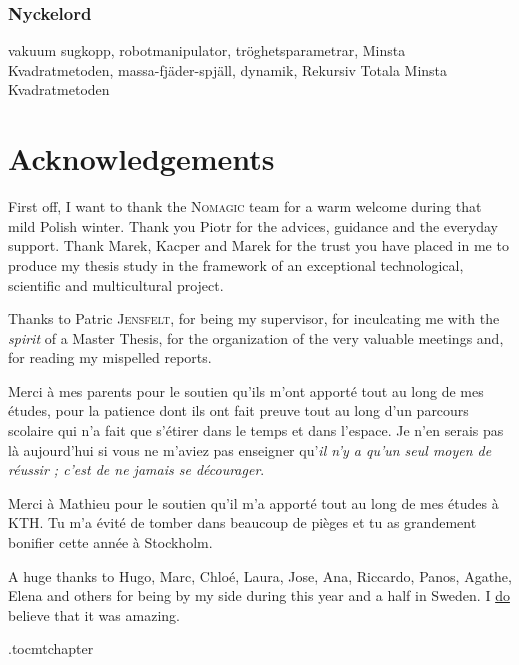 \documentclass[/home/francois/latex/report/main.tex]{subfiles}
\begin{document}
\subsection*{Nyckelord}

vakuum sugkopp, robotmanipulator, tröghetsparametrar, Minsta Kvadratmetoden, massa-fjäder-spjäll, dynamik, Rekursiv Totala Minsta Kvadratmetoden

\newpage
\thispagestyle{plain}
\chapter*{Acknowledgements}

First off, I want to thank the \textsc{Nomagic} team for a warm welcome during that mild Polish winter. Thank you Piotr for the advices, guidance and the everyday support. Thank Marek, Kacper and Marek for the trust you have placed in me to produce my thesis study in the framework of an exceptional technological, scientific and multicultural project.

Thanks to Patric \textsc{Jensfelt}, for being my supervisor, for inculcating me with the \textit{spirit} of a Master Thesis, for the organization of the very valuable meetings and, for reading my mispelled reports.

Merci à mes parents pour le soutien qu'ils m'ont apporté tout au long de mes études, pour la patience dont ils ont fait preuve tout au long d'un parcours scolaire qui n'a fait que s'étirer dans le temps et dans l'espace. Je n'en serais pas là aujourd'hui si vous ne m'aviez pas enseigner qu'\textit{il n'y a qu'un seul moyen de réussir ; c'est de ne jamais se décourager}.

Merci à Mathieu pour le soutien qu'il m'a apporté tout au long de mes études à KTH. Tu m'a évité de tomber dans beaucoup de pièges et tu as grandement bonifier cette année à Stockholm.

A huge thanks to Hugo, Marc, Chloé, Laura, Jose, Ana, Riccardo, Panos, Agathe, Elena and others for being by my side during this year and a half in Sweden. I \underline{do} believe that it was amazing.

\newpage



\newpage

\etocdepthtag.toc{mtchapter}
\thispagestyle{plain}
\tableofcontents

\newpage
\end{document}
